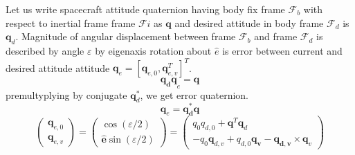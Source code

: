 Let us write spacecraft attitude quaternion having body fix frame $\displaystyle \mathcal{F}_{b}$ with respect to inertial frame frame $\displaystyle \mathcal{F} i$ as $\displaystyle \mathbf{q}$ and desired attitude in body frame $\displaystyle \mathcal{F}_{d}$ is $\displaystyle \mathbf{q}_{d}$. Magnitude of angular displacement between frame $\displaystyle \mathcal{F}_{b}$ and frame $\displaystyle \mathcal{F}_{d}$ is described by angle $\displaystyle \varepsilon $ by eigenaxis rotation about $\displaystyle \hat{e}$ is error between current and desired attitude attitude $\displaystyle \mathbf{q}_{e} =\left[\mathbf{q}_{e,0} ,\mathbf{q}^{T}_{e,v}\right]^{T}$.
\begin{equation*}
\mathbf{q_{d} q}_{e} =\mathbf{q}
\end{equation*}
premultyplying by conjugate $\displaystyle \mathbf{q}^{*}_{d}$, we get error quaternion.
\begin{equation*}
\mathbf{q}_{e} =\mathbf{q^{*}_{d} q}
\end{equation*}
\begin{equation}
\begin{pmatrix}
\mathbf{q}_{e,0}\\
\mathbf{q}_{e,v}
\end{pmatrix} =\begin{pmatrix}
\cos( \varepsilon /2) \ \\
\mathbf{\hat{e}}\sin( \varepsilon /2)
\end{pmatrix} =\begin{pmatrix}
q_{0} q_{d,0} +\mathbf{q}^{T}\mathbf{q}_{d}\\
-q_{0}\mathbf{q}_{d,v} +q_{d,0}\mathbf{q_{v}} -\mathbf{q_{d,v}} \times \mathbf{q}_{v}
\end{pmatrix}
\end{equation}
